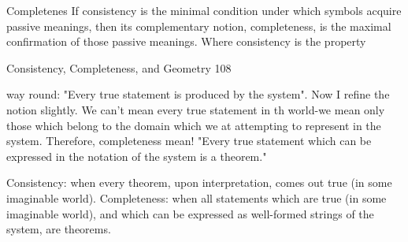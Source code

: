                                      Completenes
If consistency is the minimal condition under which symbols acquire passive meanings,
then its complementary notion, completeness, is the maximal confirmation of those
passive meanings. Where consistency is the property




Consistency, Completeness, and Geometry                                                 108

way round: "Every true statement is produced by the system". Now I refine the notion
slightly. We can't mean every true statement in th world-we mean only those which
belong to the domain which we at attempting to represent in the system. Therefore,
completeness mean! "Every true statement which can be expressed in the notation of the
system is a theorem."

   Consistency: when every theorem, upon interpretation, comes out true (in some
                imaginable world).
   Completeness: when all statements which are true (in some imaginable world), and
                which can be expressed as well-formed strings of the system, are
                theorems.

